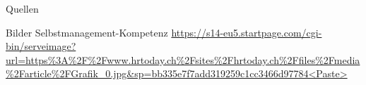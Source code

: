 \begin{frame}{Quellen}
\begin{thebibliography}{10}
     \beamertemplatearticlebibitems
         Bilder
% 
         \newblock Selbstmanagement-Kompetenz \url{https://s14-eu5.startpage.com/cgi-bin/serveimage?url=https%3A%2F%2Fwww.hrtoday.ch%2Fsites%2Fhrtoday.ch%2Ffiles%2Fmedia%2Farticle%2FGrafik_0.jpg&sp=bb335e7f7add319259c1cc3466d97784<Paste>}
% 
% 
% 
% 
% 
% 
% 
%
%
%
    \end{thebibliography}

\end{frame}

